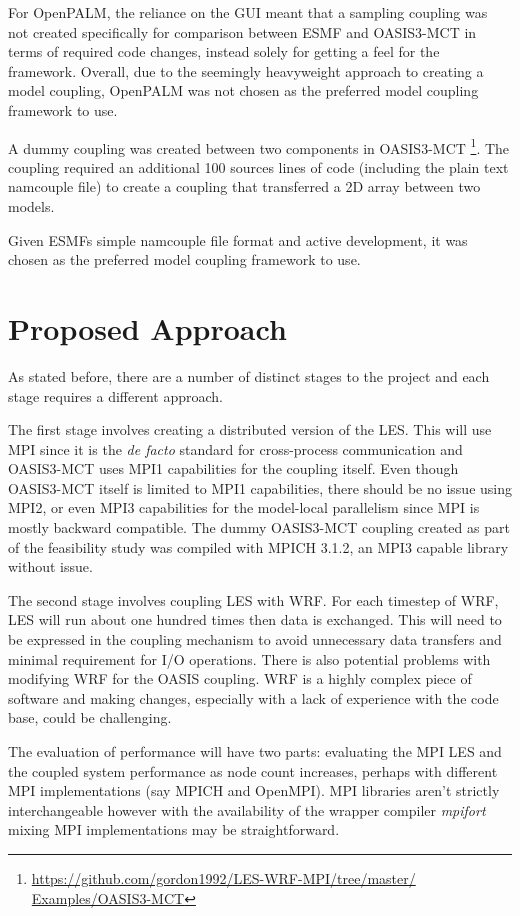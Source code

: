 \documentclass{acm_proc_article-sp}
\begin{document}
For OpenPALM, the reliance on the GUI meant that a sampling coupling was not
created specifically for comparison between ESMF and OASIS3-MCT in terms of
required code changes, instead solely for getting a feel for the framework.
Overall, due to the seemingly heavyweight approach to creating a model coupling,
OpenPALM was not chosen as the preferred model coupling framework to use.

A dummy coupling was created between two components in OASIS3-MCT
\footnote{\url{https://github.com/gordon1992/LES-WRF-MPI/tree/master/
Examples/OASIS3-MCT}}. The coupling required an additional 100 sources lines of
code (including the plain text namcouple file) to create a coupling that
transferred a 2D array between two models.

Given ESMFs simple namcouple file format and active development, it was chosen
as the preferred model coupling framework to use.

\section*{Proposed Approach}

As stated before, there are a number of distinct stages to the project and each
stage requires a different approach.

The first stage involves creating a distributed version of the LES. This will
use MPI since it is the \textit{de facto} standard for cross-process
communication and OASIS3-MCT uses MPI1 capabilities for the coupling itself.
Even though OASIS3-MCT itself is limited to MPI1 capabilities, there should be
no issue using MPI2, or even MPI3 capabilities for the model-local parallelism
since MPI is mostly backward compatible. The dummy OASIS3-MCT coupling created
as part of the feasibility study was compiled with MPICH 3.1.2, an MPI3 capable
library without issue.

The second stage involves coupling LES with WRF. For each timestep of WRF, LES
will run about one hundred times then data is exchanged. This will need to be
expressed in the coupling mechanism to avoid unnecessary data transfers and
minimal requirement for I/O operations. There is also potential problems with
modifying WRF for the OASIS coupling. WRF is a highly complex piece of software
and making changes, especially with a lack of experience with the code base,
could be challenging.

The evaluation of performance will have two parts: evaluating the MPI LES and
the coupled system performance as node count increases, perhaps with different
MPI implementations (say MPICH and OpenMPI). MPI libraries aren't strictly
interchangeable however with the availability of the wrapper compiler
\textit{mpifort} mixing MPI implementations may be straightforward.
\end{document}
